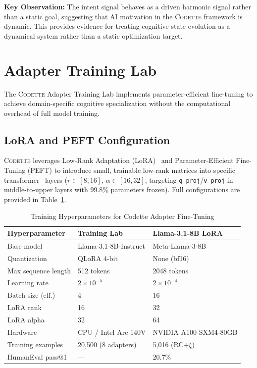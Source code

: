 \documentclass[11pt,a4paper]{article}
\newcommand{\rcxi}{RC+$\xi$}
\newcommand{\codette}{\textsc{Codette}}
\begin{document}
\medskip
\noindent\textbf{Key Observation:} The intent signal behaves as a driven harmonic signal rather than a static goal, suggesting that AI motivation in the \codette{} framework is dynamic. This provides evidence for treating cognitive state evolution as a dynamical system rather than a static optimization target.

\section{Adapter Training Lab}
\label{sec:training}

The \codette{} Adapter Training Lab implements parameter-efficient fine-tuning to achieve domain-specific cognitive specialization without the computational overhead of full model training.

\subsection{LoRA and PEFT Configuration}
\codette{} leverages Low-Rank Adaptation (LoRA)~\citep{hu2021lora} and Parameter-Efficient Fine-Tuning (PEFT) to introduce small, trainable low-rank matrices into specific transformer~\citep{vaswani2017attention} layers ($r \in [8, 16]$, $\alpha \in [16, 32]$, targeting \texttt{q\_proj}/\texttt{v\_proj} in middle-to-upper layers with 99.8\% parameters frozen). Full configurations are provided in Table~\ref{tab:hyperparams}.

\begin{table}[H]
\centering
\caption{Training Hyperparameters for Codette Adapter Fine-Tuning}
\label{tab:hyperparams}
\begin{tabular}{@{}lll@{}}
\toprule
\textbf{Hyperparameter} & \textbf{Training Lab} & \textbf{Llama-3.1-8B LoRA} \\
\midrule
Base model          & Llama-3.1-8B-Instruct & Meta-Llama-3-8B \\
Quantization        & QLoRA 4-bit           & None (bf16) \\
Max sequence length  & 512 tokens            & 2048 tokens \\
Learning rate       & $2 \times 10^{-5}$    & $2 \times 10^{-4}$ \\
Batch size (eff.)   & 4                     & 16 \\
LoRA rank           & 16                    & 32 \\
LoRA alpha          & 32                    & 64 \\
Hardware            & CPU / Intel Arc 140V  & NVIDIA A100-SXM4-80GB \\
Training examples   & 20,500 (8 adapters)   & 5,016 (\rcxi{}) \\
HumanEval pass@1    & ---                   & 20.7\% \\
\bottomrule
\end{tabular}
\end{table}
\end{document}
